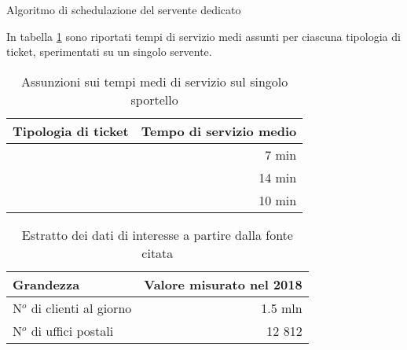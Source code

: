 \begin{algorithm}
\SetAlgoLined
{}
\caption{Algoritmo di schedulazione del servente dedicato}
\label{alg:modello-specifiche-2}
\end{algorithm}

\newpage
In tabella \ref{table:modello-specifiche-1} sono riportati tempi di servizio medi assunti per ciascuna tipologia di ticket, sperimentati su un singolo servente.
\begin{table}[ht]
\centering
{\tablecolors
\begin{tabular}{| l | r |}
\hline
Tipologia di ticket & Tempo di servizio medio \\
\hline
\uo{} & 7 min \\
\hline
\pp{} & 14 min \\
\hline
\sr{} & 10 min \\
\hline
\end{tabular}}
\caption{Assunzioni sui tempi medi di servizio sul singolo sportello}
\label{table:modello-specifiche-1}
\end{table}	

\begin{table}[ht]
\centering
{\tablecolors
\begin{tabular}{| l | r |}
\hline
Grandezza & Valore misurato nel 2018 \\
\hline
N$^o$ di clienti al giorno & 1.5 mln \\
\hline
N$^o$ di uffici postali & 12 812 \\
\hline
\end{tabular}}
\caption{Estratto dei dati di interesse a partire dalla fonte citata}
\label{table:modello-specifiche-2}
\end{table}

